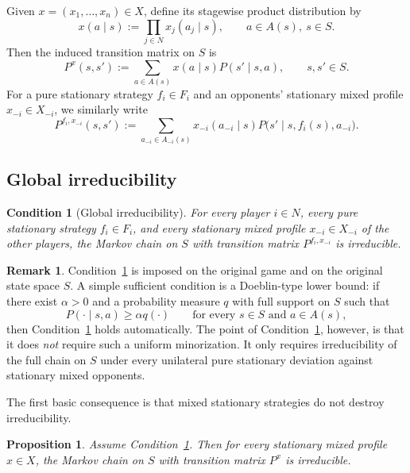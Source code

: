 \documentclass[11pt]{article}
\newtheorem{proposition}[theorem]{Proposition}
\newtheorem{condition}[theorem]{Condition}
\theoremstyle{definition}
\newtheorem{remark}[theorem]{Remark}
\newcommand{\1}{\mathbf{1}}
\begin{document}
Given $x=(x_1,\dots,x_n)\in X$, define its stagewise product distribution by
\[
x(a\mid s):=\prod_{j\in N}x_j(a_j\mid s),\qquad a\in A(s),\ s\in S.
\]
Then the induced transition matrix on $S$ is
\[
P^x(s,s'):=\sum_{a\in A(s)}x(a\mid s)P(s'\mid s,a),\qquad s,s'\in S.
\]
For a pure stationary strategy $f_i\in F_i$ and an opponents' stationary mixed profile $x_{-i}\in X_{-i}$, we similarly write
\[
P^{f_i,x_{-i}}(s,s'):=\sum_{a_{-i}\in A_{-i}(s)}x_{-i}(a_{-i}\mid s)
P\bigl(s'\mid s,f_i(s),a_{-i}\bigr).
\]

\subsection{Global irreducibility}

\begin{condition}[Global irreducibility]\label{cond:A}
For every player $i\in N$, every pure stationary strategy $f_i\in F_i$, and every stationary mixed profile $x_{-i}\in X_{-i}$ of the other players, the Markov chain on $S$ with transition matrix $P^{f_i,x_{-i}}$ is irreducible.
\end{condition}

\begin{remark}
Condition~\ref{cond:A} is imposed on the original game and on the original state space $S$. A simple sufficient condition is a Doeblin-type lower bound: if there exist $\alpha>0$ and a probability measure $q$ with full support on $S$ such that
\[
P(\cdot\mid s,a)\ge \alpha q(\cdot)\qquad\text{for every }s\in S\text{ and }a\in A(s),
\]
then Condition~\ref{cond:A} holds automatically. The point of Condition~\ref{cond:A}, however, is that it does \emph{not} require such a uniform minorization. It only requires irreducibility of the full chain on $S$ under every unilateral pure stationary deviation against stationary mixed opponents.
\end{remark}

The first basic consequence is that mixed stationary strategies do not destroy irreducibility.

\begin{proposition}\label{prop:mixed-irreducible}
Assume Condition~\ref{cond:A}. Then for every stationary mixed profile $x\in X$, the Markov chain on $S$ with transition matrix $P^x$ is irreducible.
\end{proposition}
\end{document}
